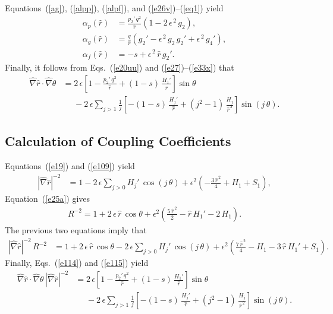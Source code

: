 \documentclass[12pt,prb,aps]{revtex4-1}
\begin{document}
Equations~(\ref{ag}), (\ref{alpp}), (\ref{alpf}), and (\ref{e26v})--(\ref{eq1}) yield\,\cite{tj}
\begin{align}
\alpha_p(\hat{r}) &= \frac{p_2'\,q^2}{\hat{r}}\left(1-2\,\epsilon^{\,2}\,g_2\right),\\[0.5ex]
\alpha_g(\hat{r}) &= \frac{q}{\hat{r}}\left(g_2' -\epsilon^{\,2}\,g_2\,g_2'+\epsilon^{\,2}\,g_4'\right),\\[0.5ex]
\alpha_f(\hat{r}) &= -s + \epsilon^{\,2}\,\hat{r}\,g_2'.
\end{align}
Finally, it follows from Eqs.~(\ref{e20uu}) and (\ref{e27})--(\ref{e33x}) that
\begin{align}\label{e114}
\hat{\nabla}\hat{r}\cdot\hat{\nabla}\theta &= 2\,\epsilon\left[1-\frac{p_2'\,q^2}{\hat{r}} +(1-s)\,\frac{H_1'}{\hat{r}}\right]\sin\theta\nonumber\\[0.5ex]
&\phantom{=}-2\,\epsilon\sum_{j>1}\frac{1}{j}\left[-(1-s)\,\frac{H_j'}{\hat{r}} + (j^2-1)\,\frac{H_j}{\hat{r}^{\,2}}\right]\sin(j\,\theta).
\end{align}

\subsection{Calculation of Coupling Coefficients}
Equations~(\ref{e19}) and (\ref{e109}) yield 
\begin{align}\label{e115}
|\hat{\nabla}\hat{r}|^{-2} &= 1 - 2\,\epsilon\sum_{j>0}H_j'\,\cos(j\,\theta)  
+ \epsilon^2\left(-\frac{3\,\hat{r}^{\,2}}{4} + H_1 + S_1\right),
\end{align}
Equation~(\ref{e25a}) gives
\begin{align}
R^{-2}= 1 + 2\,\epsilon\,\hat{r}\,\cos\theta +\epsilon^2\left(\frac{5\,\hat{r}^{\,2}}{2} - \hat{r}\,H_1'-2\,H_1\right).
\end{align}
The previous two equations imply that
\begin{align}\label{e117}
|\hat{\nabla}\hat{r}|^{-2} \,R^{-2}&= 1 +2\,\epsilon\,\hat{r}\,\cos\theta -2\,\epsilon \sum_{j>0}H_j'\,\cos(j\,\theta) + \epsilon^2\left(\frac{7\,\hat{r}^{\,2}}{4} - H_1 -3\,\hat{r}\,H_1' + S_1\right).
\end{align}
Finally, Eqs.~(\ref{e114}) and (\ref{e115}) yield
\begin{align}\label{e118}
\hat{\nabla}\hat{r}\cdot\hat{\nabla}\theta \,|\hat{\nabla}\hat{r}|^{-2} &= 2\,\epsilon\left[1-\frac{p_2'\,q^2}{\hat{r}} +(1-s)\,\frac{H_1'}{\hat{r}}\right]\sin\theta\nonumber\\[0.5ex]
&\phantom{=}-2\,\epsilon\sum_{j>1}\frac{1}{j}\left[-(1-s)\,\frac{H_j'}{\hat{r}} + (j^2-1)\,\frac{H_j}{\hat{r}^{\,2}}\right]\sin(j\,\theta).
\end{align}
\end{document}
